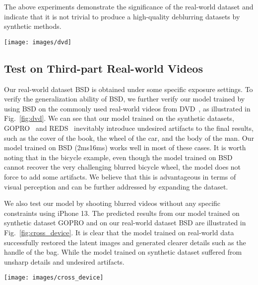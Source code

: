 \documentclass[twocolumn]{svjour3}          \smartqed  \usepackage{graphicx}
\begin{document}
The above experiments demonstrate the significance of the real-world dataset and indicate that it is not trivial to produce a high-quality deblurring datasets by synthetic methods.

\begin{figure*}[ht]
	\centering
    \texttt{[image: images/dvd]}
	\caption{Qualitative results on real-world videos from~\cite{cho2012video,su2017deep}}
	\label{fig:dvd}
\end{figure*}

\subsection{Test on Third-part Real-world Videos}
Our real-world dataset BSD is obtained under some specific exposure settings. To verify the generalization ability of BSD, we further verify our model trained by using BSD on the commonly used real-world videos from DVD~\cite{cho2012video,su2017deep}, as illustrated in Fig.~\ref{fig:dvd}. We can see that our model trained on the synthetic datasets, GOPRO~\cite{nah2017deep} and REDS~\cite{nah2019ntire} inevitably introduce undesired artifacts to the final results, such as the cover of the book, the wheel of the car, and the body of the man. Our model trained on BSD (2ms16ms) works well in most of these cases. It is worth noting that in the bicycle example, even though the model trained on BSD cannot recover the very challenging blurred bicycle wheel, the model does not force to add some artifacts. We believe that this is advantageous in terms of visual perception and can be further addressed by expanding the dataset.

We also test our model by shooting blurred videos without any specific constraints using iPhone 13. The predicted results from our model trained on synthetic dataset GOPRO and on our real-world dataset BSD are illustrated in Fig.~\ref{fig:cross_device}. It is clear that the model trained on real-world data successfully restored the latent images and generated clearer details such as the handle of the bag. While the model trained on synthetic dataset suffered from unsharp details and undesired artifacts.

\begin{figure*}[ht]
	\centering
\texttt{[image: images/cross\_device]}
	\caption{Testing on real-world blurry videos from iPhone 13. Ours (Synthetic) denotes the results of ESTRNN trained on synthetic dataset GOPRO. Ours (real) denotes the results of ESTRNN trained on real-world dataset BSD (2ms-16ms).}
	\label{fig:cross_device}
\end{figure*}
\end{document}
